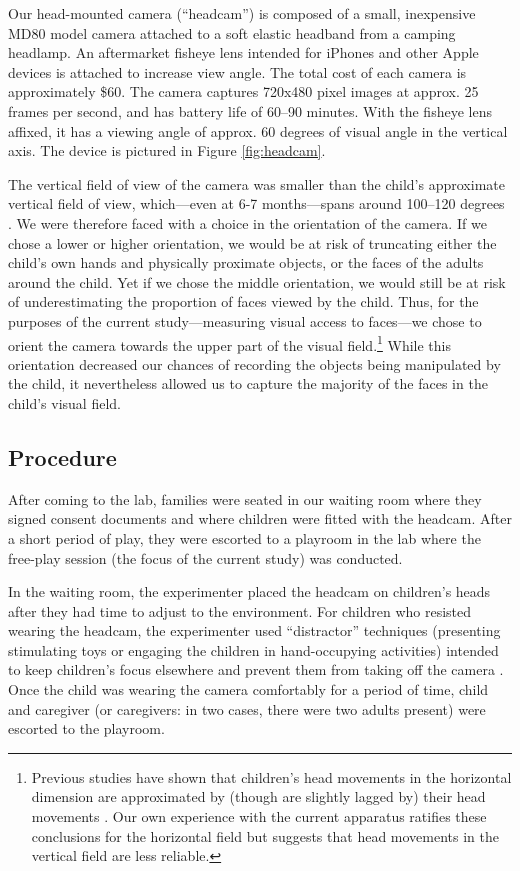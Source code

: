 \documentclass[10pt,letterpaper]{article}
\begin{document}
Our head-mounted camera (``headcam'') is composed of a small, inexpensive MD80 model camera attached to a soft elastic headband from a camping headlamp. An aftermarket fisheye lens intended for iPhones and other Apple devices is attached to increase view angle. The total cost of each camera is approximately \$60. The camera captures 720x480 pixel images at approx. 25 frames per second, and has battery life of 60--90 minutes. With the fisheye lens affixed, it has a viewing angle of approx. 60 degrees of visual angle in the vertical axis. The device is pictured in Figure \ref{fig:headcam}.

The vertical field of view of the camera was smaller than the child's approximate vertical field of view, which---even at 6-7 months---spans around 100--120 degrees \cite{mayer1988,cummings1988}. We were therefore faced with a choice in the orientation of the camera. If we chose a lower or higher orientation, we would be at risk of truncating either the child's own hands and physically proximate objects, or the faces of the adults around the child. Yet if we chose the middle orientation, we would still be at risk of underestimating the proportion of faces viewed by the child. Thus, for the purposes of the current study---measuring visual access to faces---we chose to orient the camera towards the upper part of the visual field.\footnote{Previous studies have shown that children's head movements in the horizontal dimension are approximated by (though are slightly lagged by) their head movements \cite{yoshida2008}. Our own experience with the current apparatus ratifies these conclusions for the horizontal field but suggests that head movements in the vertical field are less reliable.} While this orientation decreased our chances of recording the objects being manipulated by the child, it nevertheless allowed us to capture the majority of the faces in the child's visual field.

\subsection{Procedure}

After coming to the lab, families were seated in our waiting room where they signed consent documents and where children were fitted with the headcam. After a short period of play, they were escorted to a playroom in the lab where the free-play session (the focus of the current study) was conducted. 

In the waiting room, the experimenter placed the headcam on children's heads after they had time to adjust to the environment. For children who resisted wearing the headcam, the experimenter used ``distractor'' techniques (presenting stimulating toys or engaging the children in hand-occupying activities) intended to keep children's focus elsewhere and prevent them from taking off the camera \cite{yoshida2008}. Once the child was wearing the camera comfortably for a period of time, child and caregiver (or caregivers: in two cases, there were two adults present) were escorted to the playroom. 
\end{document}
